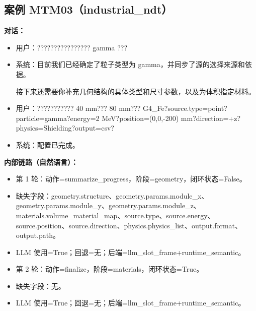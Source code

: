 \documentclass[11pt]{ctexart}
\begin{document}
\subsection{案例 MTM03（industrial\_ndt）}
\textbf{对话：}
\begin{itemize}
\item 用户：???????????????? gamma ???
\item 系统：目前我们已经确定了粒子类型为 gamma，并同步了源的选择来源和依据。

接下来还需要你补充几何结构的具体类型和尺寸参数，以及为体积指定材料。
\item 用户：??????????? 40 mm??? 80 mm??? G4\_Fe?source.type=point?particle=gamma?energy=2 MeV?position=(0,0,-200) mm?direction=+z?physics=Shielding?output=csv?
\item 系统：配置已完成。
\end{itemize}
\textbf{内部链路（自然语言）：}
\begin{itemize}
\item 第 1 轮：动作=summarize\_progress，阶段=geometry，闭环状态=False。
\item 缺失字段：geometry.structure、geometry.params.module\_x、geometry.params.module\_y、geometry.params.module\_z、materials.volume\_material\_map、source.type、source.energy、source.position、source.direction、physics.physics\_list、output.format、output.path。
\item LLM 使用=True；回退=无；后端=llm\_slot\_frame+runtime\_semantic。
\item 第 2 轮：动作=finalize，阶段=materials，闭环状态=True。
\item 缺失字段：无。
\item LLM 使用=True；回退=无；后端=llm\_slot\_frame+runtime\_semantic。
\end{itemize}
\end{document}
